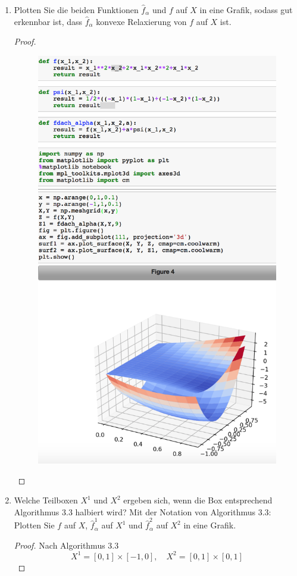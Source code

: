 \documentclass[12pt]{extreport} %
\begin{document}
\begin{enumerate}
\begin{proof}
			$$ \hat{f}_\alpha = x_1^2 x_2 + 2 x_1 x_2^2 + x_1 x_2 + \frac{9}{2} \left( - x_1 + x_1^2 + x_2^2 -1 \right) $$
		\end{proof}
	\item Plotten Sie die beiden Funktionen $\hat{f}_\alpha$ und $f$ auf $X$ in eine Grafik, sodass gut erkennbar ist, dass $\hat{f}_\alpha$ konvexe Relaxierung von $f$ auf $X$ ist.
		\begin{proof} ~\\
			\begin{figure}[h!] \centering
				\includegraphics[scale=0.46]{img/su2iv-iii-2}
			\end{figure}
		\end{proof} \newpage
	\item Welche Teilboxen $X^1$ und $X^2$ ergeben sich, wenn die Box entsprechend Algorithmus 3.3 halbiert wird? Mit der Notation von Algorithmus 3.3: Plotten Sie $f$ auf $X$, $\hat{f}_{\alpha}^1$ auf $X^1$ und $\hat{f}_{\alpha}^2$ auf $X^2$ in eine Grafik.
		\begin{proof}
			Nach Algorithmus 3.3 
			$$ X^1 = [0, 1] \times [-1, 0], \quad X^2 = [0, 1] \times [0, 1] $$
			

\end{proof}
\end{enumerate}
\end{document}
